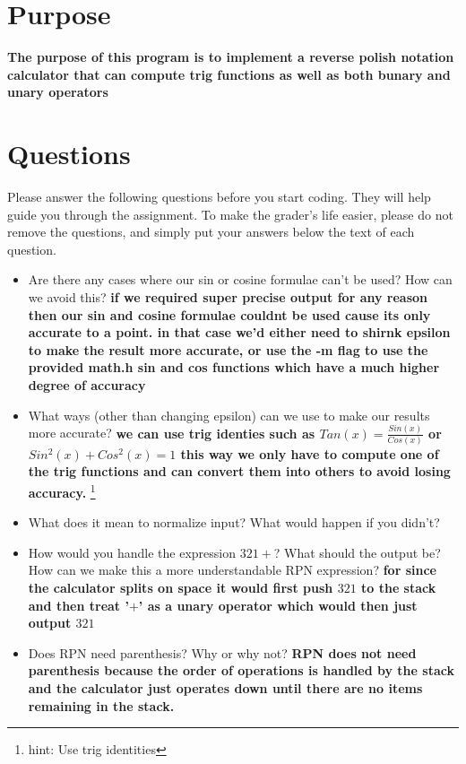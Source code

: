 \documentclass{article}
\title{\ASSIGNMENT}
\author{\NAME}
\date{\CLASS}
\begin{document}
\pagestyle{fancy}
\fancyfoot{}
\fancyhead{}
\fancyfoot[L]{\ASSIGNMENT\ -- \CLASS\ -- \NAME}
\fancyfoot[R]{\thepage}

\maketitle



\section*{Purpose}

\textbf{The purpose of this program is to implement a reverse polish notation calculator that can compute trig functions as well as both bunary and unary operators}

\section*{Questions}
Please answer the following questions before you start coding. They will help guide you through the assignment. To make the grader's life easier, please do not remove the questions, and simply put your answers below the text of each question. 
\begin{itemize}
    \item Are there any cases where our sin or cosine formulae can't be used? How can we avoid this? \textbf{if we required super precise output for any reason then our sin and cosine formulae couldnt be used cause its only accurate to a point. in that case we'd either need to shirnk epsilon to make the result more accurate, or use the -m flag to use the provided math.h sin and cos functions which have a much higher degree of accuracy }
    \item What ways (other than changing epsilon) can we use to make our results more accurate? \textbf{we can use trig identies such as $Tan(x)=\frac{Sin(x)}{Cos(x)}$ or $Sin^2(x) + Cos^2(x) = 1$ this way we only have to compute one of the trig functions and can convert them into others to avoid losing accuracy.} \footnote{hint: Use trig identities}
    \item What does it mean to normalize input? What would happen if you didn't?
    \item How would you handle the expression $3 2 1 +$? What should the output be? How can we make this a more understandable RPN expression? \textbf{for since the calculator splits on space it would first push $321$ to the stack and then treat '$+$' as a unary operator which would then just output $321$ }
    \item Does RPN need parenthesis? Why or why not? \textbf{RPN does not need parenthesis because the order of operations is handled by the stack and the calculator just operates down until there are no items remaining in the stack.}
    
\end{itemize}
\end{document}
